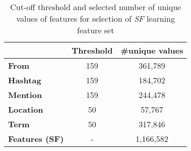 \begin{table}[!h]
\centering
{\renewcommand{\arraystretch}{1.2}
\begin{tabular}{|l|c|c|}
\hline
 & \textbf{Threshold} & \textbf{\#unique values} \\ \hline
\textbf{From} & 159 & 361,789 \\ \hline
\textbf{Hashtag} & 159 & 184,702 \\ \hline
\textbf{Mention} & 159 & 244,478 \\ \hline
\textbf{Location} & 50 & 57,767 \\ \hline
\textbf{Term} & 50 & 317,846 \\ \hline
\textbf{Features (SF)} & - & 1,166,582 \\ \hline
\end{tabular}
}
\caption{Cut-off threshold and selected number of unique values of features for selection of \textit{SF} learning feature set}
\label{table:learningFeatures}
\end{table}

